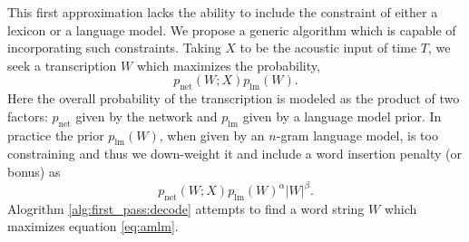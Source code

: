 This first approximation lacks the ability to include the constraint of either
a lexicon or a language model. We propose a generic algorithm which is capable
of incorporating such constraints. Taking $X$ to be the acoustic input of time
$T$, we seek a transcription $W$ which maximizes the probability,
\begin{equation}
  \label{eq:joint} p_{\text{net}}(W ; X) p_{\text{lm}}(W).  
\end{equation} 
Here the overall probability of the transcription is modeled as the product of
two factors: $p_{\text{net}}$ given by the network and $p_{\text{lm}}$ given by
a language model prior. In practice the prior $p_{\text{lm}}(W)$, when given by
an $n$-gram language model, is too constraining and thus we down-weight it and
include a word insertion penalty (or bonus) as
\begin{equation}\label{eq:amlm}
    p_{\text{net}}(W ; X) p_{\text{lm}}(W)^\alpha |W|^\beta.
\end{equation}
Alogrithm \ref{alg:first_pass:decode} attempts to find a word string $W$ which maximizes
equation \ref{eq:amlm}.
